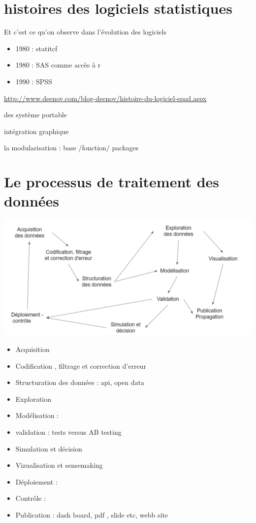 \documentclass[
]{book}
\providecommand{\tightlist}{%
  \setlength{\itemsep}{0pt}\setlength{\parskip}{0pt}}
\begin{document}
\hypertarget{histoires-des-logiciels-statistiques}{%
\section{histoires des logiciels statistiques}\label{histoires-des-logiciels-statistiques}}

Et c'est ce qu'on observe dans l'évolution des logiciels

\begin{itemize}
\tightlist
\item
  1980 : statitcf
\item
  1980 : SAS comme accès à r
\item
  1990 : SPSS
\end{itemize}

\url{http://www.deenov.com/blog-deenov/histoire-du-logiciel-spad.aspx}

des système portable

intégration graphique

la modularisation : base /fonction/ packages

\hypertarget{le-processus-de-traitement-des-donnuxe9es}{%
\section{Le processus de traitement des données}\label{le-processus-de-traitement-des-donnuxe9es}}

\includegraphics{./Images/datascience2.png}

\begin{itemize}
\tightlist
\item
  Acquisition
\item
  Codification , filtrage et correction d'erreur
\item
  Structuration des données : api, open data
\item
  Exploration
\item
  Modélisation :
\item
  validation : tests versus AB testing
\item
  Simulation et décision
\item
  Vizualisation et sensemaking
\item
  Déploiement :
\item
  Contrôle :
\item
  Publication : dash board, pdf , slide etc, webb site
\end{itemize}
\end{document}

